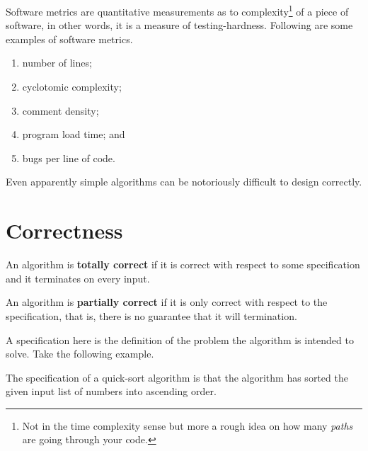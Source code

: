 \begin{definition}
    Software metrics are quantitative measurements as to complexity\footnote{Not in the time complexity sense but more a rough idea on how many \emph{paths} are going through your code.} of a piece of software, in other words, it is a measure of testing-hardness. Following are some examples of software metrics.
    \begin{enumerate}
        \item number of lines;
        \item cyclotomic complexity;
        \item comment density;
        \item program load time; and
        \item bugs per line of code.
    \end{enumerate}
\end{definition}

Even apparently simple algorithms can be notoriously difficult to design correctly.

\section{Correctness}

\begin{definition}
    An algorithm is \textbf{totally correct} if it is correct with respect to some specification and it terminates on every input.
\end{definition}

\begin{definition}
    An algorithm is \textbf{partially correct} if it is only correct with respect to the specification, that is, there is no guarantee that it will termination.
\end{definition}

A specification here is the definition of the problem the algorithm is intended to solve. Take the following example.

\begin{example}
    The specification of a quick-sort algorithm is that the algorithm has sorted the given input list of numbers into ascending order.
\end{example}

